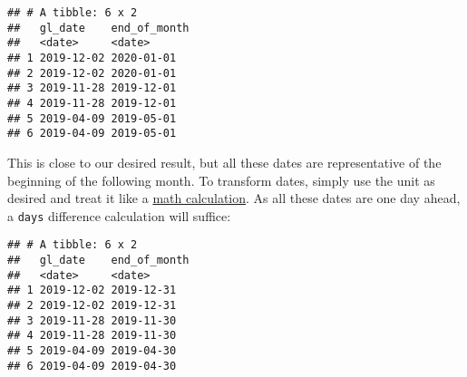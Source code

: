 \documentclass[
]{book}
\newenvironment{Shaded}{\begin{snugshade}}{\end{snugshade}}
\newcommand{\DataTypeTok}[1]{\textcolor[rgb]{0.13,0.29,0.53}{#1}}
\newcommand{\DecValTok}[1]{\textcolor[rgb]{0.00,0.00,0.81}{#1}}
\newcommand{\KeywordTok}[1]{\textcolor[rgb]{0.13,0.29,0.53}{\textbf{#1}}}
\newcommand{\NormalTok}[1]{#1}
\newcommand{\OperatorTok}[1]{\textcolor[rgb]{0.81,0.36,0.00}{\textbf{#1}}}
\newcommand{\StringTok}[1]{\textcolor[rgb]{0.31,0.60,0.02}{#1}}
\begin{document}
\begin{Shaded}
\end{Shaded}

\begin{verbatim}
## # A tibble: 6 x 2
##   gl_date    end_of_month
##   <date>     <date>      
## 1 2019-12-02 2020-01-01  
## 2 2019-12-02 2020-01-01  
## 3 2019-11-28 2019-12-01  
## 4 2019-11-28 2019-12-01  
## 5 2019-04-09 2019-05-01  
## 6 2019-04-09 2019-05-01
\end{verbatim}

This is close to our desired result, but all these dates are representative of the beginning of the following month. To transform dates, simply use the unit as desired and treat it like a \protect\hyperlink{differences-between-time}{math calculation}. As all these dates are one day ahead, a \texttt{days} difference calculation will suffice:

\begin{Shaded}
\end{Shaded}

\begin{verbatim}
## # A tibble: 6 x 2
##   gl_date    end_of_month
##   <date>     <date>      
## 1 2019-12-02 2019-12-31  
## 2 2019-12-02 2019-12-31  
## 3 2019-11-28 2019-11-30  
## 4 2019-11-28 2019-11-30  
## 5 2019-04-09 2019-04-30  
## 6 2019-04-09 2019-04-30
\end{verbatim}
\end{document}
